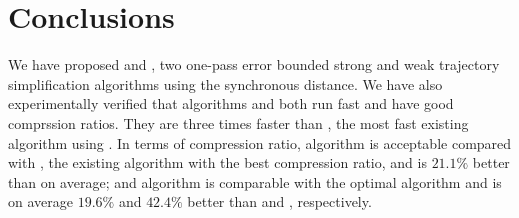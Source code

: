 \vspace{-1ex}
\section{Conclusions}  %
\label{sec-conclusion}

We have proposed \cist and \cista, two one-pass error bounded strong and weak trajectory simplification algorithms using the synchronous distance.
We have also experimentally verified that algorithms \cist and \cista both run fast and have good comprssion ratios.
They are three times faster than \squishe, the most fast existing \lsa algorithm using \sed.
%
In terms of compression ratio,
algorithm \cist is {acceptable} compared with \dps, the existing \lsa algorithm with the best compression ratio, and is $21.1\%$ better than \squishe on average; and
algorithm \cista is comparable with the optimal algorithm and is on average $19.6\%$ and $42.4\%$ better than \dps and \squishe, respectively.

